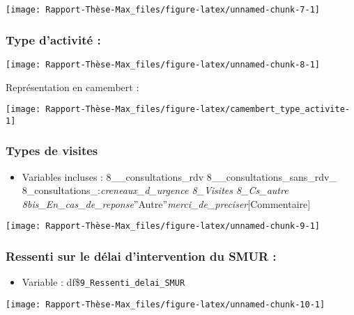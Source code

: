 \documentclass[
]{article}
\providecommand{\tightlist}{%
  \setlength{\itemsep}{0pt}\setlength{\parskip}{0pt}}
\begin{document}
\begin{center}\texttt{[image: Rapport-Thèse-Max\_files/figure-latex/unnamed-chunk-7-1]} \end{center}

\subsubsection{Type d'activité :}\label{type-dactivituxe9}

\begin{center}\texttt{[image: Rapport-Thèse-Max\_files/figure-latex/unnamed-chunk-8-1]} \end{center}

Représentation en camembert :

\begin{center}\texttt{[image: Rapport-Thèse-Max\_files/figure-latex/camembert\_type\_activite-1]} \end{center}

\subsubsection{Types de visites}\label{types-de-visites}

\begin{itemize}
\tightlist
\item
  Variables incluses : 8\_\_consultations\_rdv
  8\_\_consultations\_sans\_rdv\_
  8\_consultations\_:\emph{creneaux\_d\_urgence 8\_Visites 8\_Cs\_autre
  8bis\_En\_cas\_de\_reponse}''Autre''\emph{merci\_de\_preciser}{[}Commentaire{]}
\end{itemize}

\begin{center}\texttt{[image: Rapport-Thèse-Max\_files/figure-latex/unnamed-chunk-9-1]} \end{center}

\subsubsection{Ressenti sur le délai d'intervention du SMUR
:}\label{ressenti-sur-le-duxe9lai-dintervention-du-smur}

\begin{itemize}
\tightlist
\item
  Variable : df\$\texttt{9\_Ressenti\_delai\_SMUR}
\end{itemize}

\begin{center}\texttt{[image: Rapport-Thèse-Max\_files/figure-latex/unnamed-chunk-10-1]} \end{center}
\end{document}
